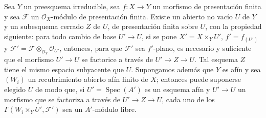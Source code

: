 \begin{proposition}[11.4.5]
\label{IV.11.4.5}
Sea $Y$ un preesquema irreducible, sea $f:X\to Y$ un morfismo de
presentación finita y sea $\mathcal F$ un $\mathcal O_X$-módulo de presentación finita. Existe un abierto no vacío $U$
de $Y$ y un subesquema cerrado $Z$ de $U$, de presentación finita sobre $U$, con la propiedad siguiente:
para todo cambio de base $U'\to U$, si se pone $X'=X\times_YU'$, $f'=f_{(U')}$ y $\mathcal F'=\mathcal F\otimes_{\mathcal O_Y}\mathcal O_{U'}$,
entonces, para que $\mathcal F'$ sea $f'$-plano, es necesario y suficiente que el morfismo $U'\to U$ se factorice
a través de $U'\to Z\to U$. Tal esquema $Z$ tiene el mismo espacio subyacente que $U$. Supongamos además que $Y$ es afín
y sea $(W_i)$ un recubrimiento abierto afín finito de $X$; entonces puede suponerse elegido $U$
de modo que, si $U'=\operatorname{Spec}(A')$ es un esquema afín y $U'\to U$ un morfismo que se factoriza
a través de $U'\to Z\to U$, cada uno de los $\Gamma(W_i\times_YU',\mathcal F')$ sea un $A'$-módulo libre.
\end{proposition}

